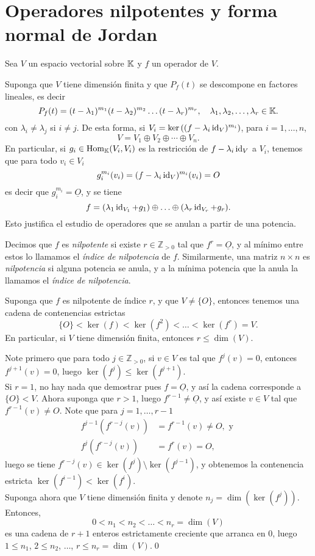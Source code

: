 \section{Operadores nilpotentes y forma normal de Jordan}

Sea $V$ un espacio vectorial sobre $\mathbb{K}$ y $f$ un operador de $V$.

Suponga que $V$ tiene dimensi\'on finita y que $P_f(t)$ se descompone en factores lineales, es decir
\[
P_f(t)=(t-\lambda_1)^{m_1}(t-\lambda_2)^{m_2}\ldots(t-\lambda_r)^{m_r}, \quad \lambda_1,\lambda_2,\ldots,\lambda_r\in \mathbb{K}.
\]
con $\lambda_i\ne\lambda_j$ si $i\ne j$. De esta forma, si $V_i=\ker\left((f-\lambda_i\operatorname{id}_V)^{m_i}\right)$, para $i=1,\ldots,n$,
\[
V=V_1\oplus V_2\oplus\cdots\oplus V_n.
\]
En particular, si $g_i\in\operatorname{Hom}_{\mathbb{K}}(V_i,V_i)$ es la restricci\'on de $f-\lambda_i\operatorname{id}_V$ a $V_i$, tenemos que para todo $v_i\in V_i$
$$g_i^{m_i}(v_i)=(f-\lambda_i\operatorname{id}_V)^{m_i}(v_i)=O$$
es decir que $g_i^{m_i}=\underline{O}$, y se tiene
$$f=(\lambda_1\operatorname{id}_{V_1}+g_1)\oplus\ldots\oplus(\lambda_r\operatorname{id}_{V_r}+g_r).$$
Esto justifica el estudio de operadores que se anulan a partir de una potencia.

\begin{defn}
Decimos que $f$ es \emph{nilpotente} si existe $r\in\mathbb{Z}_{>0}$ tal que $f^r=\underline{O}$, y al m\'inimo entre estos lo llamamos el \emph{índice de nilpotencia} de $f$. Similarmente, una matriz $n\times n$ es \emph{nilpotencia} si alguna potencia se anula, y a la mínima potencia que la anula la llamamos el \emph{índice de nilpotencia}.
\end{defn}

\begin{prop}\label{contenencia_estricta}
Suponga que $f$ es nilpotente de índice $r$, y que $V\ne\{O\}$, entonces tenemos una cadena de contenencias estrictas
\[
\{O\}<\ker(f)<\ker(f^2)<\ldots<\ker(f^r)=V.
\]
En particular, si $V$ tiene dimensi\'on finita, entonces $r\le\dim(V)$.
\end{prop}

\dem Note primero que para todo $j\in\mathbb{Z}_{>0}$, si $v\in V$ es tal que $f^j(v)=0$, entonces $f^{j+1}(v)=0$, luego $\ker(f^j)\le\ker(f^{j+1})$.\\
Si $r=1$, no hay nada que demostrar pues $f=\underline{O}$, y as\'i la cadena corresponde a $\{O\}<V$. Ahora suponga que $r>1$, luego $f^{r-1}\ne \underline{O}$, y as\'i existe $v\in V$ tal que $f^{r-1}(v)\ne O$. Note que para $j=1,\ldots,r-1$
\begin{align*}
  f^{j-1}\left(f^{r-j}(v)\right) & =f^{r-1}(v)\ne O,\textrm{ y }\\
  f^j\left(f^{r-j}(v)\right) & =f^r(v)=O,
\end{align*}
luego se tiene $f^{r-j}(v)\in \ker(f^j)\setminus \ker(f^{j-1})$, y obtenemos la contenencia estricta $\ker(f^{i-1})<\ker(f^i)$.\\
Suponga ahora que $V$ tiene dimensi\'on finita y denote $n_j=\dim(\ker(f^j))$. Entonces,
\[
0<n_1<n_2<\ldots<n_r=\dim(V)
\]
es una cadena de $r+1$ enteros estrictamente creciente que arranca en $0$, luego $1\le n_1$, $2\le n_2$, $\ldots$, $r\le n_r=\dim(V)$.\qed

